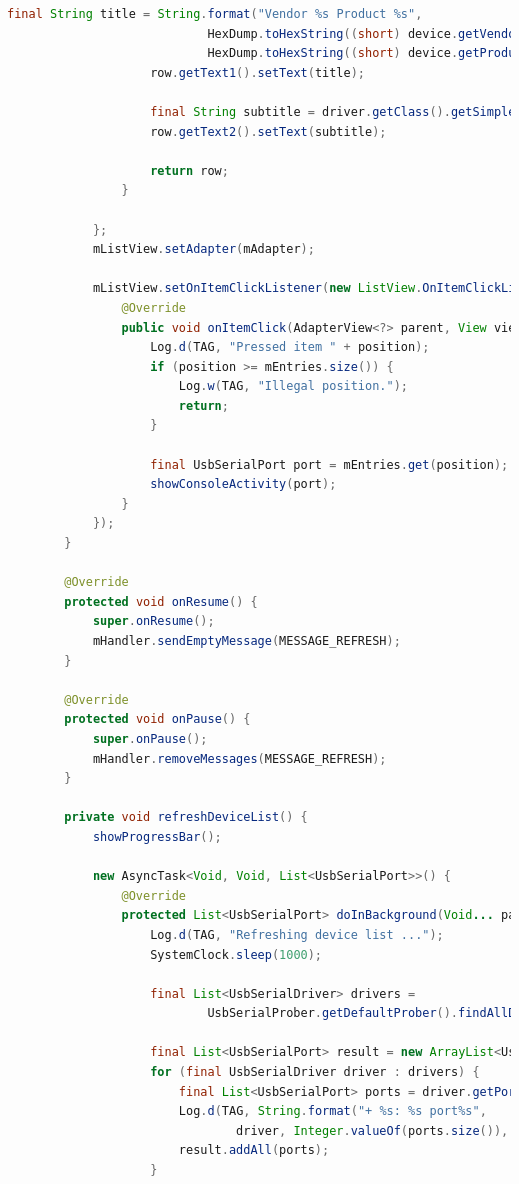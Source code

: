 \documentclass{article}
\numberwithin{figure}{section}
\numberwithin{equation}{section}
\begin{document}
{\begin{lstlisting}[language=Java,label=lst:devicelist,caption=DeviceListActivity.java]
                    final String title = String.format("Vendor %s Product %s",
                            HexDump.toHexString((short) device.getVendorId()),
                            HexDump.toHexString((short) device.getProductId()));
                    row.getText1().setText(title);

                    final String subtitle = driver.getClass().getSimpleName();
                    row.getText2().setText(subtitle);

                    return row;
                }

            };
            mListView.setAdapter(mAdapter);

            mListView.setOnItemClickListener(new ListView.OnItemClickListener() {
                @Override
                public void onItemClick(AdapterView<?> parent, View view, int position, long id) {
                    Log.d(TAG, "Pressed item " + position);
                    if (position >= mEntries.size()) {
                        Log.w(TAG, "Illegal position.");
                        return;
                    }

                    final UsbSerialPort port = mEntries.get(position);
                    showConsoleActivity(port);
                }
            });
        }

        @Override
        protected void onResume() {
            super.onResume();
            mHandler.sendEmptyMessage(MESSAGE_REFRESH);
        }

        @Override
        protected void onPause() {
            super.onPause();
            mHandler.removeMessages(MESSAGE_REFRESH);
        }

        private void refreshDeviceList() {
            showProgressBar();

            new AsyncTask<Void, Void, List<UsbSerialPort>>() {
                @Override
                protected List<UsbSerialPort> doInBackground(Void... params) {
                    Log.d(TAG, "Refreshing device list ...");
                    SystemClock.sleep(1000);

                    final List<UsbSerialDriver> drivers =
                            UsbSerialProber.getDefaultProber().findAllDrivers(mUsbManager);

                    final List<UsbSerialPort> result = new ArrayList<UsbSerialPort>();
                    for (final UsbSerialDriver driver : drivers) {
                        final List<UsbSerialPort> ports = driver.getPorts();
                        Log.d(TAG, String.format("+ %s: %s port%s",
                                driver, Integer.valueOf(ports.size()), ports.size() == 1 ? "" : "s"));
                        result.addAll(ports);
                    }


\end{lstlisting}}
\end{document}
